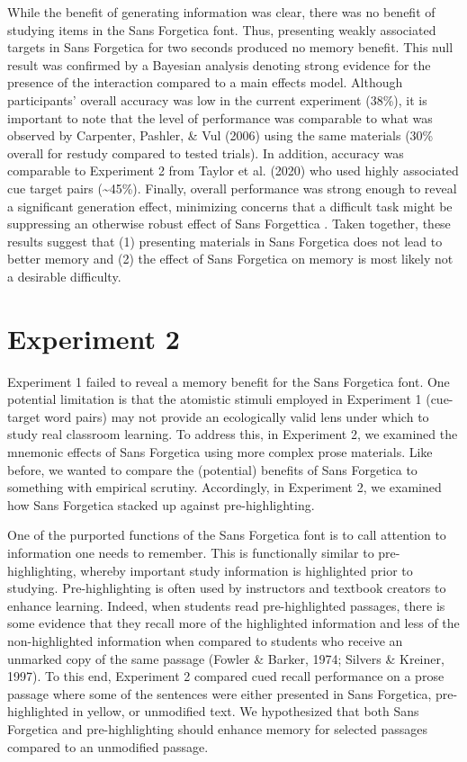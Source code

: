\documentclass[jou]{apa6}
\begin{document}
While the benefit of generating information was clear, there was no benefit of studying items in the Sans Forgetica font. Thus, presenting weakly associated targets in Sans Forgetica for two seconds produced no memory benefit. This null result was confirmed by a Bayesian analysis denoting strong evidence for the presence of the interaction compared to a main effects model. Although participants' overall accuracy was low in the current experiment (38\%), it is important to note that the level of performance was comparable to what was observed by Carpenter, Pashler, \& Vul (2006) using the same materials (30\% overall for restudy compared to tested trials). In addition, accuracy was comparable to Experiment 2 from Taylor et al. (2020) who used highly associated cue target pairs (\textasciitilde{}45\%). Finally, overall performance was strong enough to reveal a significant generation effect, minimizing concerns that a difficult task might be suppressing an otherwise robust effect of Sans Forgettica . Taken together, these results suggest that (1) presenting materials in Sans Forgetica does not lead to better memory and (2) the effect of Sans Forgetica on memory is most likely not a desirable difficulty.

\hypertarget{experiment-2}{%
\section{Experiment 2}\label{experiment-2}}

Experiment 1 failed to reveal a memory benefit for the Sans Forgetica font. One potential limitation is that the atomistic stimuli employed in Experiment 1 (cue-target word pairs) may not provide an ecologically valid lens under which to study real classroom learning. To address this, in Experiment 2, we examined the mnemonic effects of Sans Forgetica using more complex prose materials. Like before, we wanted to compare the (potential) benefits of Sans Forgetica to something with empirical scrutiny. Accordingly, in Experiment 2, we examined how Sans Forgetica stacked up against pre-highlighting.

One of the purported functions of the Sans Forgetica font is to call attention to information one needs to remember. This is functionally similar to pre-highlighting, whereby important study information is highlighted prior to studying. Pre-highlighting is often used by instructors and textbook creators to enhance learning. Indeed, when students read pre-highlighted passages, there is some evidence that they recall more of the highlighted information and less of the non-highlighted information when compared to students who receive an unmarked copy of the same passage (Fowler \& Barker, 1974; Silvers \& Kreiner, 1997). To this end, Experiment 2 compared cued recall performance on a prose passage where some of the sentences were either presented in Sans Forgetica, pre-highlighted in yellow, or unmodified text. We hypothesized that both Sans Forgetica and pre-highlighting should enhance memory for selected passages compared to an unmodified passage.
\end{document}
